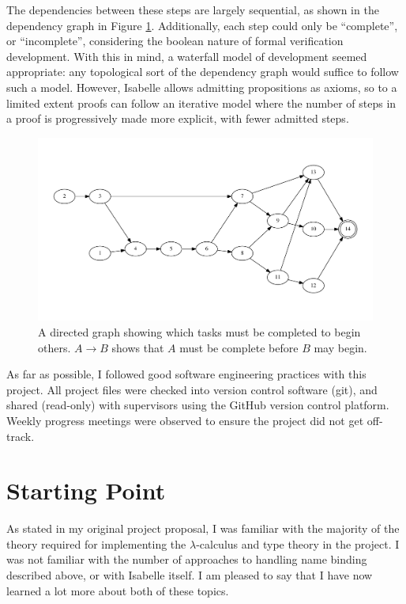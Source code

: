 The dependencies between these steps are largely sequential, as shown in the dependency graph in Figure \ref{fig:requirements-dependencies}.
Additionally, each step could only be ``complete'', or ``incomplete'', considering the boolean nature of formal verification development.
With this in mind, a waterfall model of development seemed appropriate: any topological sort of the dependency graph would suffice to follow such a model.
However, Isabelle allows admitting propositions as axioms, so to a limited extent proofs can follow an iterative model where the number of steps in a proof is progressively made more explicit, with fewer admitted steps.

\begin{figure}
\centering
\includegraphics[width=\textwidth]{chapters/preparation/figures/dependencies}
\caption{A directed graph showing which tasks must be completed to begin others. \(A \to B\) shows that \(A\) must be complete before \(B\) may begin.}
\label{fig:requirements-dependencies}
\end{figure}

As far as possible, I followed good software engineering practices with this project.
All project files were checked into version control software (git), and shared (read-only) with supervisors using the GitHub version control platform.
Weekly progress meetings were observed to ensure the project did not get off-track.

\section{Starting Point}
As stated in my original project proposal, I was familiar with the majority of the theory required for implementing the \(\lambda\)-calculus and type theory in the project.
I was not familiar with the number of approaches to handling name binding described above, or with Isabelle itself.
I am pleased to say that I have now learned a lot more about both of these topics.

